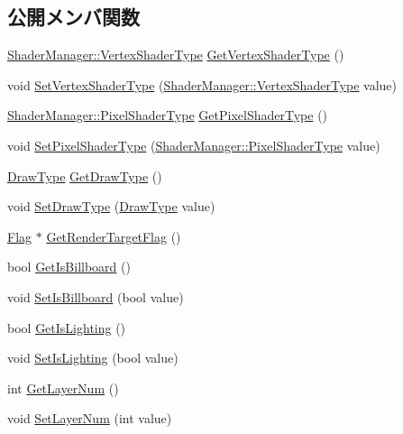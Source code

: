 \subsection*{公開メンバ関数}
\begin{DoxyCompactItemize}
\item 
\mbox{\hyperlink{class_shader_manager_a9b51e49d70eb3cc58f6d1f3994e8cfbd}{Shader\+Manager\+::\+Vertex\+Shader\+Type}} \mbox{\hyperlink{class_draw_order_list_a6533ffbf1cd3f27583e0de8a08648b75}{Get\+Vertex\+Shader\+Type}} ()
\item 
void \mbox{\hyperlink{class_draw_order_list_a1c2d881dd0d31f1c7cde4494f7c38481}{Set\+Vertex\+Shader\+Type}} (\mbox{\hyperlink{class_shader_manager_a9b51e49d70eb3cc58f6d1f3994e8cfbd}{Shader\+Manager\+::\+Vertex\+Shader\+Type}} value)
\item 
\mbox{\hyperlink{class_shader_manager_a7d15d773b3c6a99dd7086c45c8b0be5f}{Shader\+Manager\+::\+Pixel\+Shader\+Type}} \mbox{\hyperlink{class_draw_order_list_ab5f9a610bc9304a701d0f1fbaa3292fa}{Get\+Pixel\+Shader\+Type}} ()
\item 
void \mbox{\hyperlink{class_draw_order_list_a0fd7f50f4078001983f88014d59f8f29}{Set\+Pixel\+Shader\+Type}} (\mbox{\hyperlink{class_shader_manager_a7d15d773b3c6a99dd7086c45c8b0be5f}{Shader\+Manager\+::\+Pixel\+Shader\+Type}} value)
\item 
\mbox{\hyperlink{class_draw_order_list_a6c9b9ceb312c16d399ef355f4f3486bb}{Draw\+Type}} \mbox{\hyperlink{class_draw_order_list_a50dcac9d342e61f67b4d2a1d9a96bb21}{Get\+Draw\+Type}} ()
\item 
void \mbox{\hyperlink{class_draw_order_list_a5b3ff99f9297293edc057b95d23e8f2d}{Set\+Draw\+Type}} (\mbox{\hyperlink{class_draw_order_list_a6c9b9ceb312c16d399ef355f4f3486bb}{Draw\+Type}} value)
\item 
\mbox{\hyperlink{class_flag}{Flag}} $\ast$ \mbox{\hyperlink{class_draw_order_list_aff90f57ce3ff0e2d7cd715267bfe024f}{Get\+Render\+Target\+Flag}} ()
\item 
bool \mbox{\hyperlink{class_draw_order_list_a265a403c0d87abbcdc71d37a2c4f7b57}{Get\+Is\+Billboard}} ()
\item 
void \mbox{\hyperlink{class_draw_order_list_abfb13518e5747d3faa351ca64ec676b2}{Set\+Is\+Billboard}} (bool value)
\item 
bool \mbox{\hyperlink{class_draw_order_list_abd19fe57bca4132c08a3443044bdf2b9}{Get\+Is\+Lighting}} ()
\item 
void \mbox{\hyperlink{class_draw_order_list_a233843bc98d389d9cfc79108b599c7a9}{Set\+Is\+Lighting}} (bool value)
\item 
int \mbox{\hyperlink{class_draw_order_list_a28c14812ea793a3f3d752d58ccb481b2}{Get\+Layer\+Num}} ()
\item 
void \mbox{\hyperlink{class_draw_order_list_a5559a24f4d87d9d087d9daabed9a11f3}{Set\+Layer\+Num}} (int value)
\end{DoxyCompactItemize}
